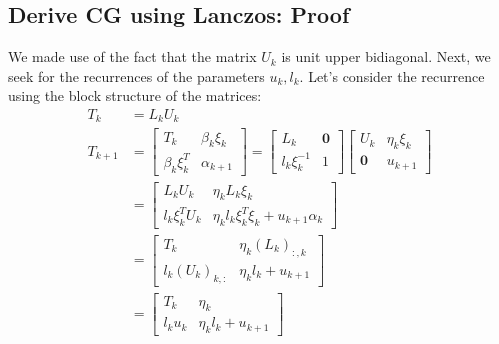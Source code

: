 \documentclass[]{article}
\theoremstyle{definition}
\begin{document}
\begin{appendices}
        \subsection{Derive CG using Lanczos: Proof}\label{sec:Derive_CG_using_Lanczos: Proof}
            We made use of the fact that the matrix $U_k$ is unit upper bidiagonal. Next, we seek for the recurrences of the parameters $u_k, l_k$. Let's consider the recurrence using the block structure of the matrices: 
            \begin{align}
                T_k &= L_kU_k
                \\
                T_{k + 1} &= \begin{bmatrix}
                    T_k & \beta_k \xi_k \\
                    \beta_k \xi^T_k & \alpha_{k + 1}
                \end{bmatrix} = 
                \begin{bmatrix}
                    L_k & \mathbf{0} \\ l_k \xi_k^{-1} & 1
                \end{bmatrix}
                \begin{bmatrix}
                    U_k & \eta_k \xi_k \\
                    \mathbf{0} & u_{k + 1}
                \end{bmatrix}
                \\
                &= 
                \begin{bmatrix}
                    L_kU_k & \eta_k L_k \xi_k 
                    \\
                    l_k \xi_k^TU_k & \eta_k l_k \xi_k^T \xi_k + u_{k + 1}\alpha_k
                \end{bmatrix}
                \\
                &= 
                \begin{bmatrix}
                    T_k & \eta_k (L_k)_{:, k} \\ 
                    l_k(U_k)_{k, :} & \eta_k l_k + u_{k + 1}
                \end{bmatrix}
                \\
                &= 
                \begin{bmatrix}
                    T_k & \eta_k \\
                    l_k u_k & \eta_k l_k + u_{k + 1}
                \end{bmatrix}
            \end{align}

\end{appendices}
\end{document}
